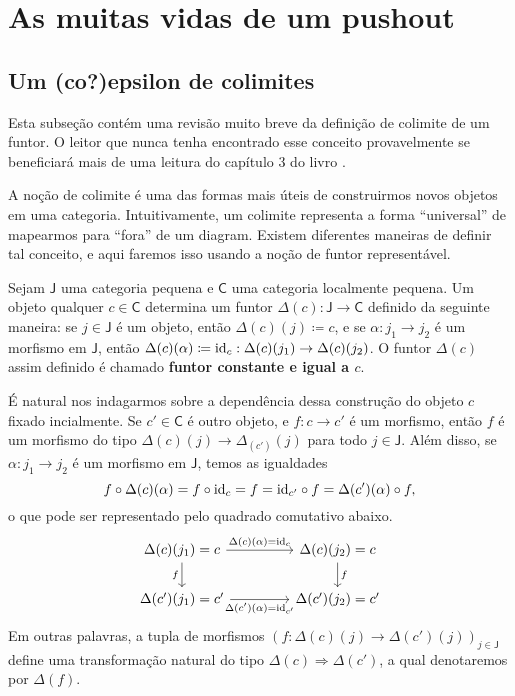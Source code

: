 \section{As muitas vidas de um pushout}
\label{sec:vidas_pushout}

\subsection{Um (co?)epsilon de colimites}
\label{sec:revisao_colimites}

Esta subseção contém uma revisão muito breve da definição de colimite de um funtor.
O leitor que nunca tenha encontrado esse conceito provavelmente se beneficiará  mais de uma leitura do capítulo 3 do livro \cite{cat_riehl}.

A noção de colimite é uma das formas mais úteis de construirmos novos objetos em uma categoria.
Intuitivamente, um colimite representa a forma ``universal'' de mapearmos para ``fora'' de um diagram.
Existem diferentes maneiras de definir tal conceito, e aqui faremos isso usando a noção de funtor representável.

Sejam $\mathsf{J}$ uma categoria pequena e $\mathsf{C}$ uma categoria localmente pequena.
Um objeto qualquer $c \in \mathsf{C}$ determina um funtor $\Delta(c): \mathsf{J} \to \mathsf{C}$ definido da seguinte maneira: se $j \in \mathsf{J}$ é um objeto, então $\Delta(c)(j) \coloneqq c$, e se $\alpha: j_1 \to j_2$ é um morfismo em $\mathsf{J}$, então $\Delta(c)(\alpha) \coloneqq \mathrm{id}_c: \Delta(c)(j_1) \to \Delta(c)(j_2)$.
O funtor $\Delta(c)$ assim definido é chamado \textbf{funtor constante e igual a $c$}.

É natural nos indagarmos sobre a dependência dessa construção do objeto $c$ fixado incialmente.
Se $c' \in \mathsf{C}$ é outro objeto, e $f: c \to c'$ é um morfismo, então $f$ é um morfismo do tipo $\Delta(c)(j) \to \Delta_(c')(j)$ para todo $j \in \mathsf{J}$.
Além disso, se $\alpha: j_1 \to j_2$ é um morfismo em $\mathsf{J}$, temos as igualdades
\begin{displaymath}
  f \circ \Delta(c)(\alpha) = f \circ \mathrm{id}_c = f = \mathrm{id}_{c'} \circ f = \Delta(c')(\alpha) \circ f,
\end{displaymath}
o que pode ser representado pelo quadrado comutativo abaixo.
\begin{displaymath}
  \begin{tikzcd}[column sep=1.5cm]
    \Delta(c)(j_1) = c
    \arrow[r, "\Delta(c)(\alpha) = \id_c"]
    \arrow[d, "f" swap]
    & \Delta(c)(j_2) = c
    \arrow[d, "f"]
    \\ \Delta(c')(j_1) = c'
    \arrow[r, "\Delta(c')(\alpha) = \id_{c'}" swap]
    & \Delta(c')(j_2) = c'
  \end{tikzcd}
\end{displaymath}
Em outras palavras, a tupla de morfismos $(f: \Delta(c)(j) \to \Delta(c')(j))_{j \in \mathsf{J}}$ define uma transformação natural do tipo $\Delta(c) \Rightarrow \Delta(c')$, a qual denotaremos por $\Delta(f)$.

